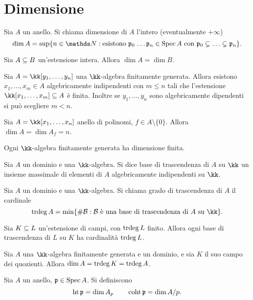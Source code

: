 \section{Dimensione}
\begin{definition}
Sia $A$ un anello. Si chiama dimensione di $A$ l'intero (eventualmente $+\infty$)
$$
\dim A=\sup\{n\in\NN:\text{esistono $\pp_0\,\ldots\pp_n\in\Spec A$ con $\pp_0\subsn\ldots\subsn\pp_n$}\}.
$$
\end{definition}
\begin{proposition}
Sia $A\subseteq B$ un'estensione intera. Allora $\dim A=\dim B$.
\end{proposition}
\begin{proposition}
Sia $A=\kk[y_1,\ldots,y_n]$ una $\kk$-algebra finitamente generata. Allora esistono $x_1,\ldots,x_m\in A$ algebricamente indipendenti con $m\le n$ tali che l'estensione $\kk[x_1,\ldots,x_m]\subs A$ è finita. Inoltre se $y_1,\ldots,y_n$ sono algebricamente dipendenti si può scegliere $m<n$.
\end{proposition}
\begin{proposition}
Sia $A=\kk[x_1,\ldots,x_n]$ anello di polinomi, $f\in A\setminus\{0\}$. Allora $\dim A=\dim A_f=n$.
\end{proposition}
\begin{corollary}
Ogni $\kk$-algebra finitamente generata ha dimensione finita.
\end{corollary}
\begin{definition}
Sia $A$ un dominio e una $\kk$-algebra. Si dice base di trascendenza di $A$ su $\kk$ un insieme massimale di elementi di $A$ algebricamente indipendenti su $\kk$.
\end{definition}
\begin{definition}
Sia $A$ un dominio e una $\kk$-algebra. Si chiama grado di trascendenza di $A$ il cardinale
$$
\trdeg A=\min\{\#\mathcal{B}:\text{$\mathcal{B}$ è una base di trascendenza di $A$ su $\kk$}\}.
$$
\end{definition}
\begin{proposition}
Sia $K\subseteq L$ un'estensione di campi, con $\operatorname{trdeg} L$ finito. Allora ogni base di trascendenza di $L$ su $K$ ha cardinalità $\operatorname{trdeg} L$.
\end{proposition}
\begin{corollary}
Sia $A$ una $\kk$-algebra finitamente generata e un dominio, e sia $K$ il suo campo dei quozienti. Allora $\dim A=\operatorname{trdeg} K=\operatorname{trdeg} A$.
\end{corollary}
\begin{definition}
Sia $A$ un anello, $\mathfrak{p}\in\operatorname{Spec} A$. Si definiscono
$$
\operatorname{ht}\mathfrak{p}=\dim A_p\qquad\operatorname{coht}\mathfrak{p}=\dim A/p.
$$
\end{definition}
